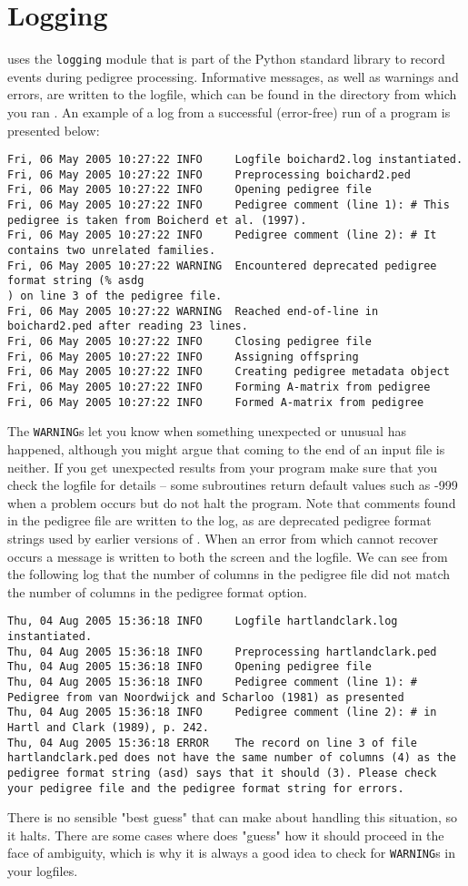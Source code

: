 \section{Logging}
\label{sec:logging}
\PyPedal{} uses the \texttt{logging} module that is part of the Python standard library to record events during pedigree processing.  Informative messages, as well as warnings and errors, are written to the logfile, which can be found in the directory from which you ran \PyPedal{}.  An example of a log from a successful (error-free) run of a program is presented below:
\begin{verbatim}
Fri, 06 May 2005 10:27:22 INFO     Logfile boichard2.log instantiated.
Fri, 06 May 2005 10:27:22 INFO     Preprocessing boichard2.ped
Fri, 06 May 2005 10:27:22 INFO     Opening pedigree file
Fri, 06 May 2005 10:27:22 INFO     Pedigree comment (line 1): # This pedigree is taken from Boicherd et al. (1997).
Fri, 06 May 2005 10:27:22 INFO     Pedigree comment (line 2): # It contains two unrelated families.
Fri, 06 May 2005 10:27:22 WARNING  Encountered deprecated pedigree format string (% asdg
) on line 3 of the pedigree file.
Fri, 06 May 2005 10:27:22 WARNING  Reached end-of-line in boichard2.ped after reading 23 lines.
Fri, 06 May 2005 10:27:22 INFO     Closing pedigree file
Fri, 06 May 2005 10:27:22 INFO     Assigning offspring
Fri, 06 May 2005 10:27:22 INFO     Creating pedigree metadata object
Fri, 06 May 2005 10:27:22 INFO     Forming A-matrix from pedigree
Fri, 06 May 2005 10:27:22 INFO     Formed A-matrix from pedigree
\end{verbatim}
The \texttt{WARNING}s let you know when something unexpected or unusual has happened, although you might argue that coming to the end of an input file is neither.  If you get unexpected results from your program make sure that you check the logfile for details -- some subroutines return default values such as -999 when a problem occurs but do not halt the program.  Note that comments found in the pedigree file are written to the log, as are deprecated pedigree format strings used by earlier versions of \PyPedal{}.  When an error from which \PyPedal{} cannot recover occurs a message is written to both the screen and the logfile.  We can see from the following log that the number of columns in the pedigree file did not match the number of columns in the pedigree format option.
\begin{verbatim}
Thu, 04 Aug 2005 15:36:18 INFO     Logfile hartlandclark.log instantiated.
Thu, 04 Aug 2005 15:36:18 INFO     Preprocessing hartlandclark.ped
Thu, 04 Aug 2005 15:36:18 INFO     Opening pedigree file
Thu, 04 Aug 2005 15:36:18 INFO     Pedigree comment (line 1): # Pedigree from van Noordwijck and Scharloo (1981) as presented
Thu, 04 Aug 2005 15:36:18 INFO     Pedigree comment (line 2): # in Hartl and Clark (1989), p. 242.
Thu, 04 Aug 2005 15:36:18 ERROR    The record on line 3 of file hartlandclark.ped does not have the same number of columns (4) as the pedigree format string (asd) says that it should (3). Please check your pedigree file and the pedigree format string for errors.
\end{verbatim}
There is no sensible "best guess" that \PyPedal{} can make about handling this situation, so it halts.  There are some cases where \PyPedal{} does "guess" how it should proceed in the face of ambiguity, which is why it is always a good idea to check for \texttt{WARNING}s in your logfiles.